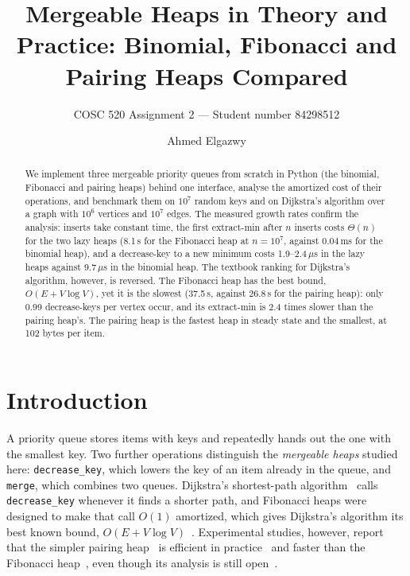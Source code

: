 \documentclass[acmsmall,nonacm]{acmart}
\newcommand{\us}{\,$\mu$s}
\newcommand{\code}[1]{\texttt{#1}}
\begin{document}
\title{Mergeable Heaps in Theory and Practice: Binomial, Fibonacci and Pairing Heaps Compared}
\subtitle{COSC 520 Assignment 2 --- Student number 84298512}

\author{Ahmed Elgazwy}

\begin{abstract}
We implement three mergeable priority queues from scratch in Python (the
binomial, Fibonacci and pairing heaps) behind one interface, analyse the
amortized cost of their operations, and benchmark them on $10^7$ random keys and
on Dijkstra's algorithm over a graph with $10^6$ vertices and $10^7$ edges. The
measured growth rates confirm the analysis: inserts take constant time, the
first extract-min after $n$ inserts costs $\Theta(n)$ for the two lazy heaps
(8.1\,s for the Fibonacci heap at $n = 10^7$, against 0.04\,ms for the binomial
heap), and a decrease-key to a new minimum costs 1.9--2.4\us{} in the lazy heaps
against 9.7\us{} in the binomial heap. The textbook ranking for Dijkstra's
algorithm, however, is reversed. The Fibonacci heap has the best bound,
$O(E + V\log V)$, yet it is the slowest (37.5\,s, against 26.8\,s for the
pairing heap): only 0.99 decrease-keys per vertex occur, and its extract-min is
2.4 times slower than the pairing heap's. The pairing heap is the fastest heap
in steady state and the smallest, at 102 bytes per item.
\end{abstract}


\maketitle

\section{Introduction}

A priority queue stores items with keys and repeatedly hands out the one with
the smallest key. Two further operations distinguish the \emph{mergeable heaps}
studied here: \code{decrease\_key}, which lowers the key of an item already in
the queue, and \code{merge}, which combines two queues. Dijkstra's
shortest-path algorithm~\cite{dijkstra1959} calls \code{decrease\_key} whenever
it finds a shorter path, and Fibonacci heaps were designed to make that call
$O(1)$ amortized, which gives Dijkstra's algorithm its best known bound,
$O(E + V \log V)$~\cite{fredman1987}. Experimental studies, however, report
that the simpler pairing heap~\cite{fredman1986} is efficient in
practice~\cite{stasko1987} and faster than the Fibonacci
heap~\cite{larkin2014}, even though its analysis is still
open~\cite{fredman1999,pettie2005}.
\end{document}
